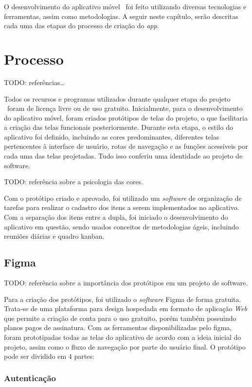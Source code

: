 O desenvolvimento do aplicativo móvel \appName\ foi feito utilizando diversas tecnologias e ferramentas, assim como metodologias. A seguir neste capítulo, serão descritas cada uma das etapas do processo de criação do \textit{app}.

\section{Processo}

TODO: referências\dots

Todos os recursos e programas utilizados durante qualquer etapa do projeto \appName\ foram de licença livre ou de uso gratuito. Inicialmente, para o desenvolvimento do aplicativo móvel, foram criados protótipos de telas do projeto, o que facilitaria a criação das telas funcionais posteriormente. Durante esta etapa, o estilo do aplicativo foi definido, incluindo as cores predominantes, diferentes telas pertencentes à interface de usuário, rotas de navegação e as funções acessíveis por cada uma das telas projetadas. Tudo isso conferiu uma identidade ao projeto de software.

TODO: referência sobre a psicologia das cores.

Com o protótipo criado e aprovado, foi utilizado um \textit{software} de organização de tarefas para realizar o cadastro dos itens a serem implementados no aplicativo. Com a separação dos itens entre a dupla, foi iniciado o desenvolvimento do aplicativo em questão, sendo usados conceitos de metodologias ágeis, incluindo reuniões diárias e quadro kanban.

\subsection{Figma}

TODO: referência sobre a importância dos protótipos em um projeto de software.

Para a criação dos protótipos, foi utilizado o \textit{software} Figma de forma gratuita. Trata-se de uma plataforma para design hospedada em formato de aplicação \textit{Web} que permite a criação de conta para o uso gratuito, porém também possuindo planos pagos de assinatura. Com as ferramentas disponibilizadas pelo figma, foram prototipadas todas as telas do aplicativo de acordo com a ideia inicial do projeto, assim como o fluxo de navegação por parte do usuário final. O protótipo pode ser dividido em 4 partes:

\subsubsection{Autenticação}

